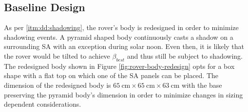 \subsection{Baseline Design}
As per \ref{itm:dd:shadowing}, the rover's body is redesigned in order to minimize shadowing events. A pyramid shaped body continuously casts a shadow on a surrounding \ac{SA} with an exception during solar noon. Even then, it is likely that the rover would be tilted to achieve $\beta_{best}$ and thus still be subject to shadowing. The redesigned body shown in Figure \ref{fig:rover-body-redesign} opts for a box shape with a flat top on which one of the \ac{SA} panels can be placed. The dimension of the redesigned body is $\SI{65}{\centi\meter}\times\SI{65}{\centi\meter}\times\SI{63}{\centi\meter}$ with the base preserving the pyramid body's dimension in order to minimize changes in sizing dependent considerations.


